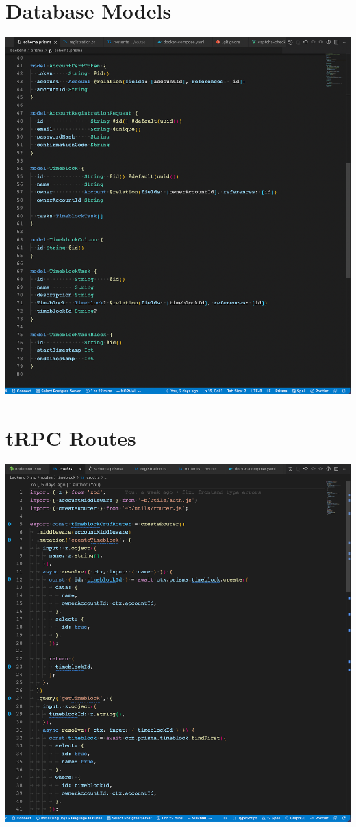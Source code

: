 \documentclass[notitlepage, 12pt]{report}
\begin{document}
\section*{Database Models}
\includegraphics[width=1\textwidth]{backend-database-models.png}

\section*{tRPC Routes}
\includegraphics[width=1\textwidth]{backend-trpc-routes.png}
\end{document}
